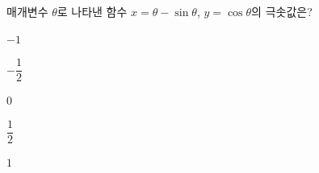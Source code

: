매개변수 $\theta$로 나타낸 함수 $x=\theta-\sin\theta$, $y=\cos\theta$의 극솟값은? 
\begin{choices32}{\rule[-3ex]{0pt}{8ex}$-1$}{\rule[-3ex]{0pt}{8ex}$-\dfrac{1}{2}$}{\rule[-3ex]{0pt}{8ex}$0$}{\rule[-3ex]{0pt}{8ex}$\dfrac{1}{2}$}{\rule[-3ex]{0pt}{8ex}$1$}\end{choices32}
